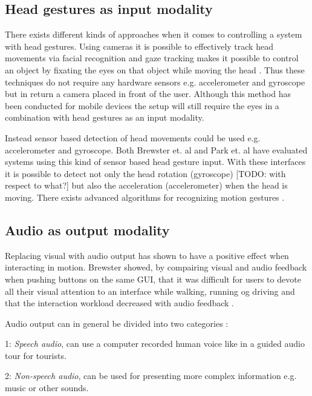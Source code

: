 \subsection{Head gestures as input modality}

There exists different kinds of approaches when it comes to controlling a system with head gestures. Using cameras it is possible to effectively track head movements via facial recognition \cite{morimoto_recognition_1996} and gaze tracking makes it possible to control an object by fixating the eyes on that object while moving the head \cite{vspakov_enhanced_2012}. Thus these techniques do not require any hardware sensors e.g. accelerometer and gyroscope but in return a camera placed in front of the user. Although this method has been conducted for mobile devices \cite{mardanbegi_eye-based_2012} the setup will still require the eyes in a combination with head gestures as an input modality.

Instead sensor based detection of head movements could be used e.g. accelerometer and gyroscope. Both Brewster et. al \cite{brewster_multimodaleyes-freeinteraction_2003} and Park et. al \cite{park_gaze-directed_2011} have evaluated systems using this kind of sensor based head gesture input. With these interfaces it is possible to detect not only the head rotation (gyroscope) [TODO: with respect to what?] but also the acceleration (accelerometer) when the head is moving. There exists advanced algorithms for recognizing motion gestures \cite{lu_head_2005, kratz_combining_2013, akl_accelerometer-based_2010}.

\subsection{Audio as output modality}
\label{sec:audiomodality}
Replacing visual with audio output has shown to have a positive effect when interacting in motion. Brewster showed, by compairing visual and audio feedback when pushing buttons on the same GUI, that it was difficult for users to devote all their visual attention to an interface while walking, running og driving and that the interaction workload decreased with audio feedback \cite{brewster_overcoming_2002}.

Audio output can in general be divided into two categories \cite{rocchesso_sounding_2003}:
\begin{description}
\item{1: \textit{Speech audio}}, can use a computer recorded human voice like in a guided audio tour for tourists.
\item{2: \textit{Non-speech audio}}, can be used for presenting more complex information e.g. music or other sounds.
\end{description}

